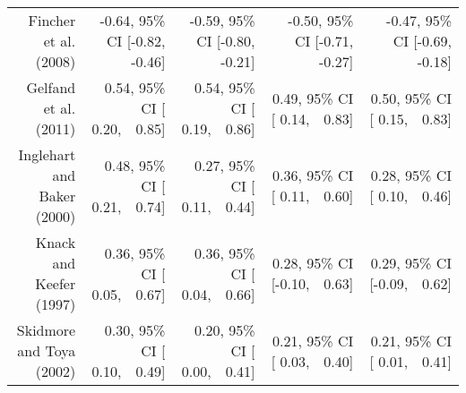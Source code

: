 \documentclass[
  man,floatsintext]{apa6}
\newenvironment{lltable}{\begin{landscape}\centering\begin{ThreePartTable}}{\end{ThreePartTable}\end{landscape}}
\begin{document}
\begin{lltable}
{\begin{longtable}{rrrrr}
Fincher et al. (2008) & -0.64, 95\% CI [-0.82, -0.46] & -0.59, 95\% CI [-0.80, -0.21] & -0.50, 95\% CI [-0.71, -0.27] & -0.47, 95\% CI [-0.69, -0.18]\\
Gelfand et al. (2011) & 0.54, 95\% CI [ 0.20,\ \ 0.85] & 0.54, 95\% CI [ 0.19,\ \ 0.86] & 0.49, 95\% CI [ 0.14,\ \ 0.83] & 0.50, 95\% CI [ 0.15,\ \ 0.83]\\
Inglehart and Baker (2000) & 0.48, 95\% CI [ 0.21,\ \ 0.74] & 0.27, 95\% CI [ 0.11,\ \ 0.44] & 0.36, 95\% CI [ 0.11,\ \ 0.60] & 0.28, 95\% CI [ 0.10,\ \ 0.46]\\
Knack and Keefer (1997) & 0.36, 95\% CI [ 0.05,\ \ 0.67] & 0.36, 95\% CI [ 0.04,\ \ 0.66] & 0.28, 95\% CI [-0.10,\ \ 0.63] & 0.29, 95\% CI [-0.09,\ \ 0.62]\\
Skidmore and Toya (2002) & 0.30, 95\% CI [ 0.10,\ \ 0.49] & 0.20, 95\% CI [ 0.00,\ \ 0.41] & 0.21, 95\% CI [ 0.03,\ \ 0.40] & 0.21, 95\% CI [ 0.01,\ \ 0.41]\\
\bottomrule
\end{longtable}

}

\end{lltable}

\newpage
\end{document}
